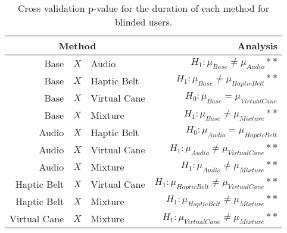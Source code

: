 
\begin{table}[!htb]
\centering
\caption{Cross validation p-value for the duration of each method for blinded users.}
\label{tab:lsd_duration_avg}
\begin{tabular}{rclr}
\toprule
      \multicolumn{3}{c}{Method} &                                           Analysis \\
\midrule
              Base & $X$ & Audio &               $H_1 : \mu_{Base} \ne \mu_{Audio}**$ \\
        Base & $X$ & Haptic Belt &         $H_1 : \mu_{Base} \ne \mu_{Haptic Belt}**$ \\
       Base & $X$ & Virtual Cane &            $H_0 : \mu_{Base} = \mu_{Virtual Cane}$ \\
            Base & $X$ & Mixture &             $H_1 : \mu_{Base} \ne \mu_{Mixture}**$ \\
       Audio & $X$ & Haptic Belt &            $H_0 : \mu_{Audio} = \mu_{Haptic Belt}$ \\
      Audio & $X$ & Virtual Cane &       $H_1 : \mu_{Audio} \ne \mu_{Virtual Cane}**$ \\
           Audio & $X$ & Mixture &            $H_1 : \mu_{Audio} \ne \mu_{Mixture}**$ \\
Haptic Belt & $X$ & Virtual Cane & $H_1 : \mu_{Haptic Belt} \ne \mu_{Virtual Cane}**$ \\
     Haptic Belt & $X$ & Mixture &      $H_1 : \mu_{Haptic Belt} \ne \mu_{Mixture}**$ \\
    Virtual Cane & $X$ & Mixture &     $H_1 : \mu_{Virtual Cane} \ne \mu_{Mixture}**$ \\
\bottomrule
\end{tabular}
\end{table}

